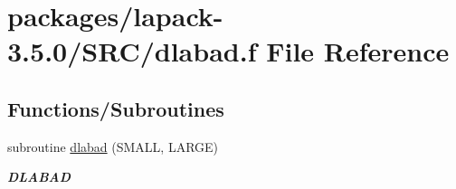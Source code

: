 \hypertarget{dlabad_8f}{}\section{packages/lapack-\/3.5.0/\+S\+R\+C/dlabad.f File Reference}
\label{dlabad_8f}
\subsection*{Functions/\+Subroutines}
\begin{DoxyCompactItemize}
\item 
subroutine \hyperlink{group__auxOTHERauxiliary_ga57ac7409aedb2a380d5d0e625ffbeb7a}{dlabad} (S\+M\+A\+L\+L, L\+A\+R\+G\+E)
\begin{DoxyCompactList}\small\item\em {\bfseries D\+L\+A\+B\+A\+D} \end{DoxyCompactList}\end{DoxyCompactItemize}
